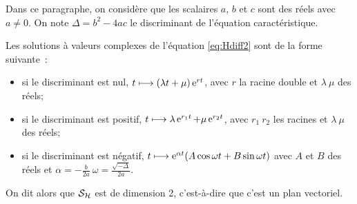 Dans ce paragraphe, on considère que les scalaires \(a\), \(b\) et \(c\) sont
des réels avec \(a \neq 0\). On note \(\Delta = b^2-4ac\) le discriminant de
l'équation caractéristique.
\begin{theo}
  \label{theo:6}
  Les solutions à valeurs complexes de l'équation \eqref{eq:Hdiff2} sont de la
  forme suivante~:
  \begin{itemize}
    \item si le discriminant est nul, \(t \longmapsto (\lambda t +
      \mu)\operatorname{e}^{rt}\), avec \(r\) la racine double et \(\lambda \ \mu\) des
      réels;
    \item si le discriminant est positif, \(t \longmapsto \lambda \operatorname{e}^{r_1 t}
      + \mu \operatorname{e}^{r_2 t}\), avec \(r_1 \ r_2\) les racines et \(\lambda \
      \mu\) des réels;
    \item si le discriminant est négatif, \(t \longmapsto \operatorname{e}^{\alpha t} (A
      \cos \omega t + B \sin \omega t)\) avec \(A\) et \(B\) des réels et
      \(\alpha = -\frac{b}{2a} \ \omega = \frac{\sqrt{-\Delta}}{2a}\).
  \end{itemize}
  On dit alors que \(\mathcal{S}_{\mathcal{H}{}}\) est de dimension 2, c'est-à-dire que c'est un plan vectoriel.
\end{theo}

